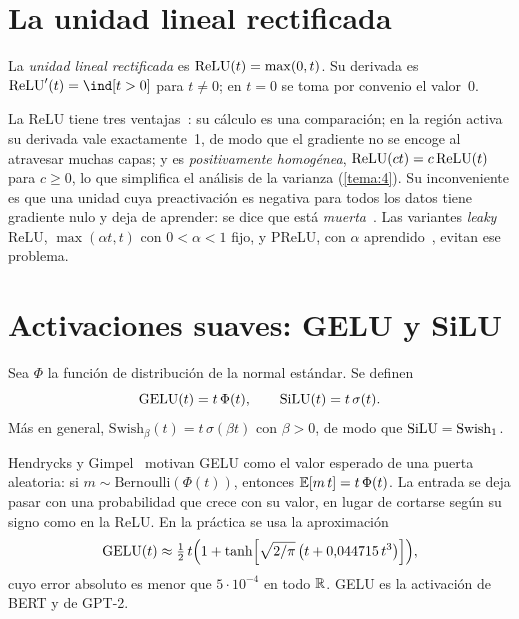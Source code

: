 \section{La unidad lineal rectificada}

\begin{definicion}[ReLU]
La \emph{unidad lineal rectificada} es $\operatorname{ReLU}(t)=\max(0,t)$. Su derivada es $\ReLU'(t)=\ind[t>0]$ para $t\neq 0$; en $t=0$ se toma por convenio el valor~0.
\end{definicion}

La ReLU tiene tres ventajas~\cite[§6.3.1]{gbc}: su cálculo es una comparación; en la región activa su derivada vale exactamente~1, de modo que el gradiente no se encoge al atravesar muchas capas; y es \emph{positivamente homogénea}, $\operatorname{ReLU}(ct)=c\operatorname{ReLU}(t)$ para $c\ge 0$, lo que simplifica el análisis de la varianza (\cref{tema:4}). Su inconveniente es que una unidad cuya preactivación es negativa para todos los datos tiene gradiente nulo y deja de aprender: se dice que está \emph{muerta}~\cite{cs231n}. Las variantes \emph{leaky} ReLU, $\max(\alpha t,t)$ con $0<\alpha<1$ fijo, y PReLU, con $\alpha$ aprendido~\cite{he}, evitan ese problema.

\section{Activaciones suaves: GELU y SiLU}

\begin{definicion}\label{def:gelu}
Sea $\Phi$ la función de distribución de la normal estándar. Se definen
\[
\operatorname{GELU}(t)=t\,\Phi(t),\qquad \operatorname{SiLU}(t)=t\,\sigma(t).
\]
Más en general, $\mathrm{Swish}_\beta(t)=t\,\sigma(\beta t)$ con $\beta>0$, de modo que $\operatorname{SiLU}=\mathrm{Swish}_1$.
\end{definicion}

Hendrycks y Gimpel~\cite{hendrycks} motivan GELU como el valor esperado de una puerta aleatoria: si $m\sim\mathrm{Bernoulli}(\Phi(t))$, entonces $\mathbb{E}[m\,t]=t\,\Phi(t)$. La entrada se deja pasar con una probabilidad que crece con su valor, en lugar de cortarse según su signo como en la ReLU. En la práctica se usa la aproximación
\[
\operatorname{GELU}(t)\approx\tfrac12\,t\Bigl(1+\tanh\Bigl[\sqrt{2/\pi}\,\bigl(t+0{,}044715\,t^{3}\bigr)\Bigr]\Bigr),
\]
cuyo error absoluto es menor que $5\cdot 10^{-4}$ en todo $\mathbb{R}$. GELU es la activación de BERT y de GPT-2.

\addtocounter{figure}{1}%


